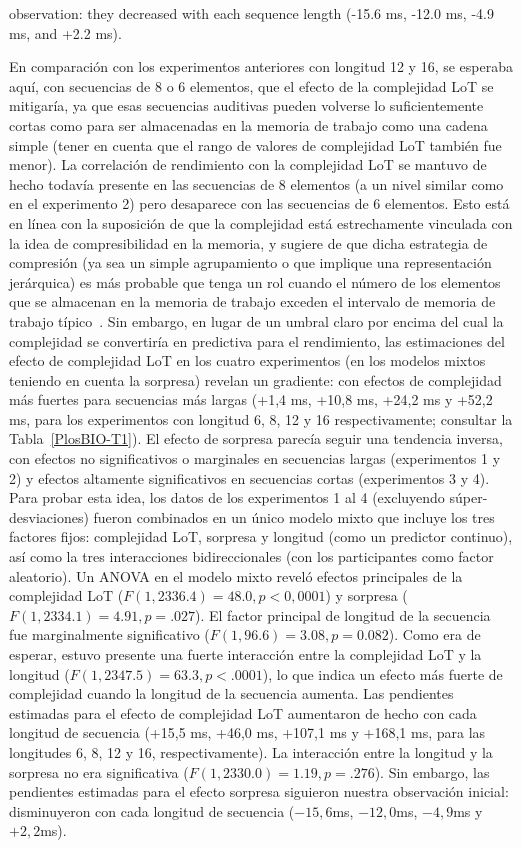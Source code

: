 observation: they decreased with each sequence length (-15.6 ms, -12.0 ms, -4.9 ms, and +2.2 ms).

En comparación con los experimentos anteriores con longitud 12 y 16, se esperaba aquí, con secuencias de 8 o 6 elementos, que el efecto de la complejidad LoT se mitigaría, ya que esas secuencias auditivas pueden volverse lo suficientemente cortas como para ser almacenadas en la memoria de trabajo como una cadena simple (tener en cuenta que el rango de valores de complejidad LoT también fue menor). La correlación de rendimiento con la complejidad LoT se mantuvo de hecho todavía presente en las secuencias de 8 elementos (a un nivel similar como en el experimento 2) pero desaparece con las secuencias de 6 elementos. Esto está en línea con la suposición de que la complejidad está estrechamente vinculada con la idea de compresibilidad en la memoria, y sugiere de que dicha estrategia de compresión (ya sea un simple agrupamiento o que implique una representación jerárquica) es más probable que tenga un rol cuando el número de los elementos que se almacenan en la memoria de trabajo exceden el intervalo de memoria de trabajo típico~\cite{f16,f89}. Sin embargo, en lugar de un umbral claro por encima del cual la complejidad se convertiría en predictiva para el rendimiento, las estimaciones del efecto de complejidad LoT en los cuatro experimentos (en los modelos mixtos teniendo en cuenta la sorpresa) revelan un gradiente: con efectos de complejidad más fuertes para secuencias más largas (+1,4 ms, +10,8 ms, +24,2 ms y +52,2 ms, para los experimentos con longitud 6, 8, 12 y 16 respectivamente; consultar la Tabla~\ref{PlosBIO-T1}). El efecto de sorpresa parecía seguir una tendencia inversa, con efectos no significativos o marginales en secuencias largas (experimentos 1 y 2) y efectos altamente significativos en secuencias cortas (experimentos 3 y 4). Para probar esta idea, los datos de los experimentos 1 al 4 (excluyendo súper-desviaciones) fueron combinados en un único modelo mixto que incluye los tres factores fijos: complejidad LoT, sorpresa y longitud (como un predictor continuo), así como la tres interacciones bidireccionales (con los participantes como factor aleatorio). Un ANOVA en el modelo mixto reveló efectos principales de la complejidad LoT ($F (1, 2336.4) = 48.0, p <0,0001$) y sorpresa ($F (1, 2334.1) = 4.91, p = .027$). El factor principal de longitud de la secuencia fue marginalmente significativo ($F (1, 96.6) = 3.08, p = 0.082$). Como era de esperar, estuvo presente una fuerte interacción entre la complejidad LoT y la longitud ($F (1, 2347.5) = 63.3, p < .0001$), lo que indica un efecto más fuerte de complejidad cuando la longitud de la secuencia aumenta. Las pendientes estimadas para el efecto de complejidad LoT aumentaron de hecho con cada longitud de secuencia (+15,5 ms, +46,0 ms, +107,1 ms y +168,1 ms, para las longitudes 6, 8, 12 y 16, respectivamente). La interacción entre la longitud y la sorpresa no era significativa ($F (1, 2330.0) = 1.19, p = .276$). Sin embargo, las pendientes estimadas para el efecto sorpresa siguieron nuestra observación inicial: disminuyeron con cada longitud de secuencia ($-15,6$ms, $-12,0$ms, $-4,9$ms y $+ 2,2$ms).

